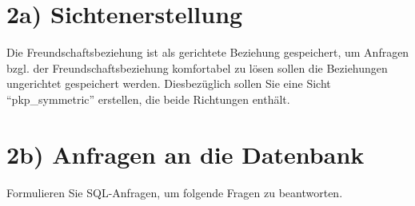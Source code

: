 





\section*{2a) Sichtenerstellung}
Die Freundschaftsbeziehung ist als gerichtete Beziehung gespeichert, um Anfragen bzgl. der Freundschaftsbeziehung komfortabel zu lösen sollen die Beziehungen ungerichtet gespeichert werden.
Diesbezüglich sollen Sie eine Sicht \enquote{pkp\_symmetric} erstellen, die beide Richtungen enthält.

\section*{2b) Anfragen an die Datenbank}
Formulieren Sie SQL-Anfragen, um folgende Fragen zu beantworten.

